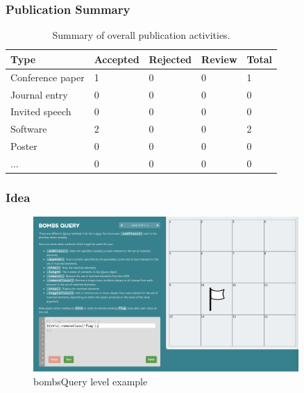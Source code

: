 \documentclass[10pt,xcolor=pdflatex]{beamer}
\begin{document}
\begin{frame}\frametitle{Publication Summary}
\begin{table}[]
\centering
\label{my-label}
\begin{tabular}{|l|l|l|l|l|}
\hline
Type             & Accepted & Rejected & Review & Total \\ \hline
Conference paper &   1      &   0      &  0     &  1    \\ \hline
Journal entry    &   0      &   0      &  0     &  0    \\ \hline
Invited speech   &   0      &   0      &  0     &  0    \\ \hline
Software         &   2      &   0      &  0     &  2    \\ \hline
Poster           &   0      &   0      &  0     &  0    \\ \hline
...              &   0      &   0      &  0     &  0    \\ \hline
\end{tabular}
\caption{Summary of overall publication activities.}
\end{table}
\end{frame}


\begin{frame}\frametitle{Idea}

   \begin{figure}[h!]
    \centering
      \includegraphics[width=0.9\textwidth]{img/screenshot.png}
      \caption{bombsQuery level example}
  \end{figure}
\end{frame}

\end{document}
